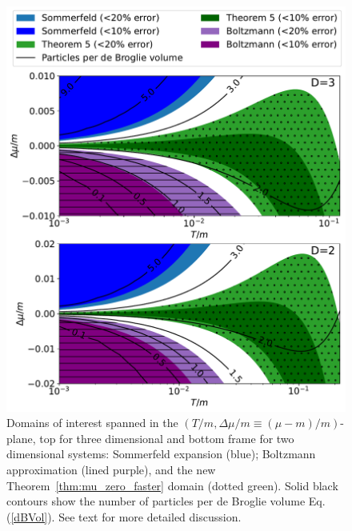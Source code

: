 \documentclass[sn-mathphys,Numbered]{sn-jnl}
\newcommand{\req}[1]{Eq.\,(\ref{#1})}
\newcommand{\rTh}[1]{Theorem~{\ref{#1}}}
\begin{document}
\begin{figure}  %
\centering
 \includegraphics[width=.75\textwidth]{plot/Sommerfeld_vs_ours_vs_Boltzmann_regions_1_term.pdf}
\caption{Domains of interest spanned in the $(T/m,\Delta\mu/m\equiv(\mu-m)/m)$-plane, top for three dimensional and bottom frame for two dimensional systems: Sommerfeld expansion (blue); Boltzmann approximation (lined purple), and the new  \rTh{thm:mu_zero_faster} domain (dotted green). Solid black contours show the number of particles per de Broglie volume \req{dBVol}. See text for more detailed discussion.}\label{fig:Thm3_vs_Sommerfeld_regions}
\end{figure}
\end{document}
